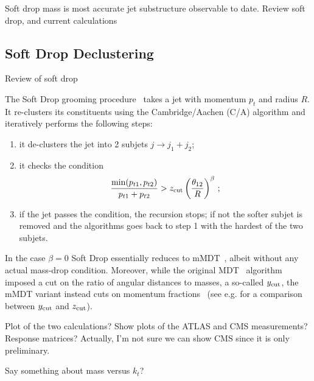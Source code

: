 
Soft drop mass is most accurate jet substructure observable to date.  Review soft drop, and current calculations

\subsection{Soft Drop Declustering}

Review of soft drop


The Soft Drop grooming procedure~\cite{Larkoski:2014wba} takes a jet
with momentum $p_t$ and radius $R$. It re-clusters its constituents
using the Cambridge/Aachen (C/A) algorithm \cite{Dokshitzer:1997in,
  Wobisch:1998wt} and iteratively performs the following steps:
\begin{enumerate}
 \item it de-clusters the jet into 2 subjets $j \to j_1 + j_2$;
 \item it checks the condition 
\begin{equation}\label{eq:sd-condition}
\frac{\min (p_{t1} , p_{t2})}{p_{t1}+p_{t2}} > z_{\rm cut} \left(
  \frac{\theta_{12}}{R}\right)^\beta\,;
\end{equation}
\item if the jet passes the condition, the recursion stops; if not the
  softer subjet is removed and the algorithms goes back to step 1 with
  the hardest of the two subjets. 
 \end{enumerate}
In the case $\beta=0$ Soft Drop essentially reduces to mMDT~\cite{Dasgupta:2013ihk},
 albeit without any actual mass-drop condition. Moreover, while the
 original MDT~\cite{Butterworth:2008iy} algorithm imposed a cut on the ratio of angular distances
 to masses, a so-called $y_{\rm cut}$, the mMDT variant instead cuts on
 momentum fractions~\cite{Dasgupta:2013ihk} (see
 e.g. \cite{Dasgupta:2013ihk,Dasgupta:2016ktv} for a comparison
 between $y_{\rm cut}$ and $z_{\rm cut}$).

Plot of the two calculations?  Show plots of the ATLAS and CMS measurements?  Response matrices?  Actually, I'm not sure we can show CMS since it is only preliminary. 

Say something about mass versus $k_t$?
